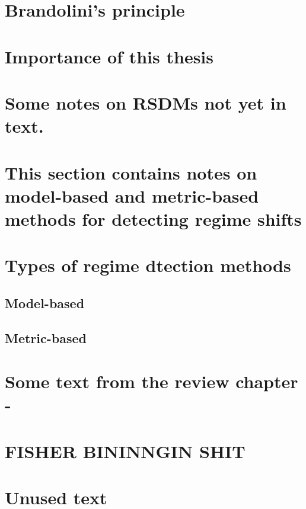 \documentclass[12pt,twoside,openany]{reedthesis}
\begin{document}
\section{Brandolini's principle}\label{brandolinis-principle}

\section{Importance of this thesis}\label{importance-of-this-thesis}

\section{Some notes on RSDMs not yet in
text.}\label{some-notes-on-rsdms-not-yet-in-text.}

\section{This section contains notes on model-based and metric-based
methods for detecting regime
shifts}\label{this-section-contains-notes-on-model-based-and-metric-based-methods-for-detecting-regime-shifts}

\section{Types of regime dtection
methods}\label{types-of-regime-dtection-methods}

\subsection{Model-based}\label{model-based}

\subsection{Metric-based}\label{metric-based}

\section{Some text from the review chapter
-}\label{some-text-from-the-review-chapter--}

\section{FISHER BININNGIN SHIT}\label{fisher-bininngin-shit}

\section{Unused text}\label{unused-text}
\end{document}
